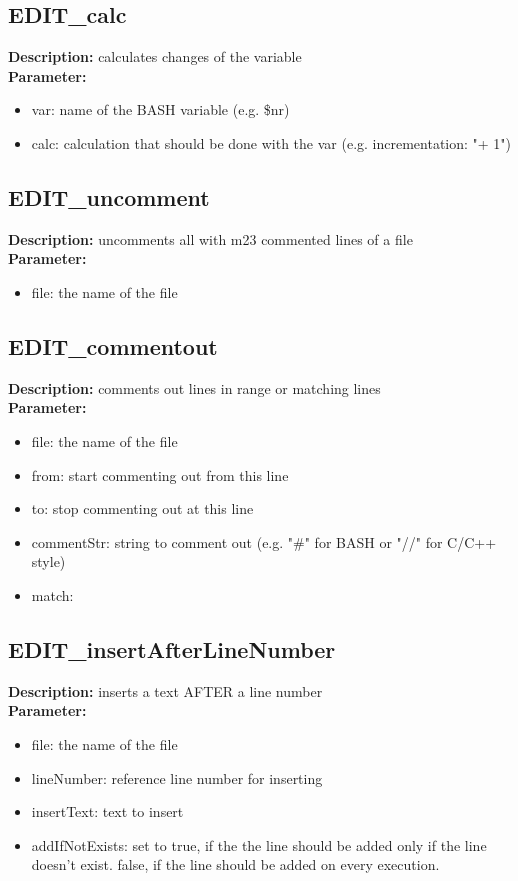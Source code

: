 \subsection{EDIT\_calc}
\textbf{Description:} calculates changes of the variable\\
\textbf{Parameter:}
\begin{itemize}
\item var: name of the BASH variable (e.g. \$nr)
\item calc: calculation that should be done with the var (e.g. incrementation: "+ 1")
\end{itemize}

\subsection{EDIT\_uncomment}
\textbf{Description:} uncomments all with m23 commented lines of a file\\
\textbf{Parameter:}
\begin{itemize}
\item file: the name of the file
\end{itemize}

\subsection{EDIT\_commentout}
\textbf{Description:} comments out lines in range or matching lines\\
\textbf{Parameter:}
\begin{itemize}
\item file: the name of the file
\item from: start commenting out from this line
\item to: stop commenting out at this line
\item commentStr: string to comment out (e.g. "\#" for BASH or "//" for C/C++ style)
\item match: 
\end{itemize}

\subsection{EDIT\_insertAfterLineNumber}
\textbf{Description:} inserts a text AFTER a line number\\
\textbf{Parameter:}
\begin{itemize}
\item file: the name of the file
\item lineNumber: reference line number for inserting
\item insertText: text to insert
\item addIfNotExists: set to true, if the the line should be added only if the line doesn't exist. false, if the line should be added on every execution.
\end{itemize}

